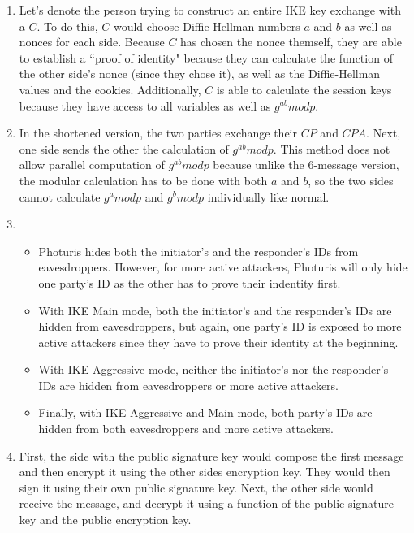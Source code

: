 \documentclass[11pt]{article}
\begin{document}
\begin{enumerate}
\item 

Let's denote the person trying to construct an entire IKE key exchange with a $C$.  To do this, $C$ would choose Diffie-Hellman numbers $a$ and $b$ as well as nonces for each side.  Because $C$ has chosen the nonce themself, they are able to establish a ``proof of identity" because they can calculate the function of the other side's nonce (since they chose it), as well as the Diffie-Hellman values and the cookies.  Additionally, $C$ is able to calculate the session keys because they have access to all variables as well as $g^{ab}mod p$.  

\item 

In the shortened version, the two parties exchange their $CP$ and $CPA$.  Next, one side sends the other the calculation of $g^{ab}mod p$.  This method does not allow parallel computation of $g^{ab}mod p$ because unlike the 6-message version, the modular calculation has to be done with both $a$ and $b$, so the two sides cannot calculate $g^a mod p$ and $g^b mod p$ individually like normal.  

\item 

\begin{itemize}
\item Photuris hides both the initiator's and the responder's IDs from eavesdroppers.  However, for more active attackers, Photuris will only hide one party's ID as the other has to prove their indentity first.  
\item With IKE Main mode, both the initiator's and the responder's IDs are hidden from eavesdroppers, but again, one party's ID is exposed to more active attackers since they have to prove their identity at the beginning.  
\item With IKE Aggressive mode, neither the initiator's nor the responder's IDs are hidden from eavesdroppers or more active attackers.  
\item Finally, with IKE Aggressive and Main mode, both party's IDs are hidden from both eavesdroppers and more active attackers.  
\end{itemize}

\item 

First, the side with the public signature key would compose the first message and then encrypt it using the other sides encryption key.  They would then sign it using their own public signature key.  Next, the other side would receive the message, and decrypt it using a function of the public signature key and the public encryption key.  


\end{enumerate}
\end{document}
